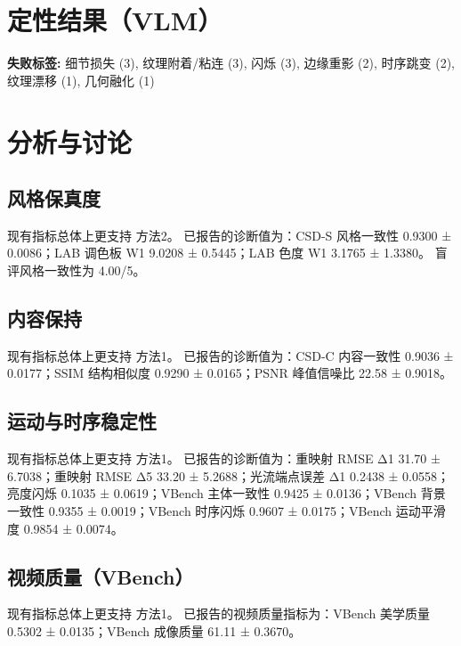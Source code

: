 \documentclass[UTF8,10pt]{ctexart}
\begin{document}
\section*{定性结果（VLM）}
\begin{table}[H]
\centering
\caption{盲评视觉评分（1--5），所有维度均为越高越好。}
\label{tab:vlm}
\small
{}
\end{table}
\noindent\textbf{失败标签:} 细节损失 (3), 纹理附着/粘连 (3), 闪烁 (3), 边缘重影 (2), 时序跳变 (2), 纹理漂移 (1), 几何融化 (1)\par
\section*{分析与讨论}
\subsection*{风格保真度}
现有指标总体上更支持 方法2。 已报告的诊断值为：CSD-S 风格一致性 0.9300 ± 0.0086；LAB 调色板 W1 9.0208 ± 0.5445；LAB 色度 W1 3.1765 ± 1.3380。 盲评风格一致性为 4.00/5。
\subsection*{内容保持}
现有指标总体上更支持 方法1。 已报告的诊断值为：CSD-C 内容一致性 0.9036 ± 0.0177；SSIM 结构相似度 0.9290 ± 0.0165；PSNR 峰值信噪比 22.58 ± 0.9018。
\subsection*{运动与时序稳定性}
现有指标总体上更支持 方法1。 已报告的诊断值为：重映射 RMSE Δ1 31.70 ± 6.7038；重映射 RMSE Δ5 33.20 ± 5.2688；光流端点误差 Δ1 0.2438 ± 0.0558；亮度闪烁 0.1035 ± 0.0619；VBench 主体一致性 0.9425 ± 0.0136；VBench 背景一致性 0.9355 ± 0.0019；VBench 时序闪烁 0.9607 ± 0.0175；VBench 运动平滑度 0.9854 ± 0.0074。
\subsection*{视频质量（VBench）}
现有指标总体上更支持 方法1。 已报告的视频质量指标为：VBench 美学质量 0.5302 ± 0.0135；VBench 成像质量 61.11 ± 0.3670。
\end{document}
